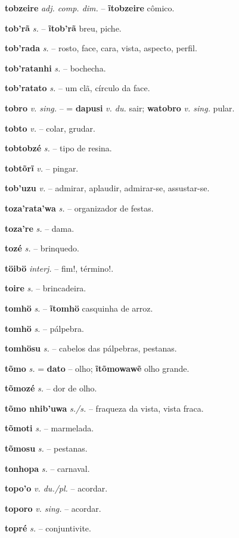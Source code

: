 \textbf{tobzeire} \textit{adj. comp. dim.} -- \textbf{ĩtobzeire} cômico.

\textbf{tob'rã} \textit{s.} -- \textbf{ĩtob'rã} breu, piche.

\textbf{tob'rada} \textit{s.} -- rosto, face, cara, vista, aspecto, perfil.

\textbf{tob'ratanhi} \textit{s.} -- bochecha.

\textbf{tob'ratato} \textit{s.} -- um clã, círculo da face.

\textbf{tobro} \textit{v. sing.} -- = \textbf{dapusi} \textit{v. du.} sair; \textbf{watobro} \textit{v. sing.} pular.

\textbf{tobto} \textit{v.} -- colar, grudar.

\textbf{tobtobzé} \textit{s.} -- tipo de resina.

\textbf{tobtõrĩ} \textit{v.} -- pingar.

\textbf{tob'uzu} \textit{v.} -- admirar, aplaudir, admirar-se, assustar-se.

\textbf{toza'rata'wa} \textit{s.} -- organizador de festas.

\textbf{toza're} \textit{s.} -- dama.

\textbf{tozé} \textit{s.} -- brinquedo.

\textbf{töibö} \textit{interj.} -- fim!, término!.

\textbf{toire} \textit{s.} -- brincadeira.

\textbf{tomhö} \textit{s.} -- \textbf{ĩtomhö} casquinha de arroz.

\textbf{tomhö} \textit{s.} -- pálpebra.

\textbf{tomhösu} \textit{s.} -- cabelos das pálpebras, pestanas.

\textbf{tõmo} \textit{s.} = \textbf{dato} -- olho; \textbf{ĩtõmowawẽ} olho grande.

\textbf{tõmozé} \textit{s.} -- dor de olho.

\textbf{tõmo nhib'uwa} \textit{s./s.} -- fraqueza da vista, vista fraca.

\textbf{tõmoti} \textit{s.} -- marmelada.

\textbf{tõmosu} \textit{s.} -- pestanas.

\textbf{tonhopa} \textit{s.} -- carnaval.

\textbf{topo'o} \textit{v. du./pl.} -- acordar.

\textbf{toporo} \textit{v. sing.} -- acordar.

\textbf{topré} \textit{s.} -- conjuntivite.

